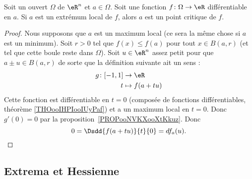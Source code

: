 \begin{proposition} \label{PropUQRooPgJsuz}
    Soit un ouvert \( \Omega\) de \( \eR^n\) et \( a\in \Omega\). Soit une fonction \( f\colon \Omega\to \eR\) différentiable en \( a\). Si \( a\) est un extrémum local de \( f\), alors \( a\) est un point critique de \( f\).
\end{proposition}

\begin{proof}
    Nous supposons que \( a\) est un maximum local (ce sera la même chose si \( a\) est un minimum). Soit \( r>0\) tel que \( f(x)\leq f(a)\) pour tout \( x\in B(a,r)\) (et tel que cette boule reste dans \( \Omega\)). Soit \( u\in \eR^n\) assez petit pour que \( a\pm u\in B(a,r)\) de sorte que la définition suivante ait un sens :
    \begin{equation}
        \begin{aligned}
            g\colon \mathopen[ -1 , 1 \mathclose] & \to \eR \\
                                  t               & \mapsto f(a+tu)
        \end{aligned}
    \end{equation}
    Cette fonction est différentiable en \( t=0\) (composée de fonctions différentiables, théorème \ref{THOooIHPIooIUyPaf}) et a un maximum local en \( t=0\). Donc \( g'(0)=0\) par la proposition~\ref{PROPooNVKXooXtKkuz}. Donc
    \begin{equation}
        0=\Dsdd{ f(a+tu) }{t}{0}=df_a(u).
    \end{equation}
\end{proof}

\subsection{Extrema et Hessienne}

